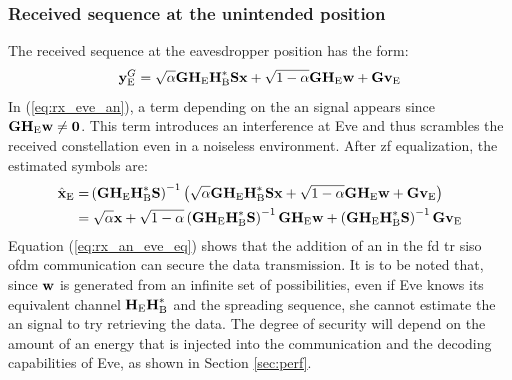 \subsubsection{Received sequence at the unintended position}
The received sequence at the eavesdropper position has the form:
\begin{equation}
    \textbf{y}_{\text{E}}^G = \sqrt{\alpha}  \textbf{G} \textbf{H}_{\text{E}} \textbf{H}_{\text{B}}^* \textbf{S}\textbf{x} + \sqrt{1-\alpha} \textbf{G} \textbf{H}_{\text{E}} \textbf{w} + \textbf{G}  \textbf{v}_\text{E}
    \label{eq:rx_eve_an}
\end{equation}
In (\ref{eq:rx_eve_an}), a term depending on the \gls{an} signal appears since $\textbf{G}\textbf{H}_{\text{E}} \textbf{w} \neq \textbf{0}$. This term introduces an interference at Eve and thus scrambles the received constellation even in a noiseless environment. After \gls{zf} equalization, the estimated symbols are:
\begin{equation}
    \begin{split}
         \hat{\textbf{x}}_{\text{E}} =& \left(\textbf{G} \textbf{H}_{\text{E}} \textbf{H}_{\text{B}}^* \textbf{S} \right)^{-1}
         \left( \sqrt{\alpha} \textbf{G} \textbf{H}_{\text{E}} \textbf{H}_{\text{B}}^* \textbf{S} \textbf{x} +   \sqrt{1-\alpha} \textbf{G} \textbf{H}_{\text{E}} \textbf{w}  +  \textbf{G}  \textbf{v}_\text{E}  \right) \\
         =& \;\sqrt{\alpha}\textbf{x} + \sqrt{1-\alpha} \left(\textbf{G} \textbf{H}_{\text{E}} \textbf{H}_{\text{B}}^* \textbf{S} \right)^{-1}  \textbf{G} \textbf{H}_{\text{E}} \textbf{w} + \left(\textbf{G} \textbf{H}_{\text{E}} \textbf{H}_{\text{B}}^* \textbf{S} \right)^{-1}  \textbf{G} \textbf{v}_\text{E}
    \end{split}
    \label{eq:rx_an_eve_eq}
\end{equation}
Equation (\ref{eq:rx_an_eve_eq}) shows that the addition of \gls{an} in the \gls{fd} \gls{tr} \gls{siso} \gls{ofdm} communication can secure the data transmission. It is to be noted that, since $\textbf{w}$ is generated from an infinite set of possibilities, even if Eve knows its equivalent channel $\textbf{H}_{\text{E}}\textbf{H}_{\text{B}}^*$ and the spreading sequence, she cannot estimate the \gls{an} signal  to try retrieving the data.  The degree of security will depend on the amount of \gls{an} energy that is injected into the communication and the decoding capabilities of Eve, as shown in Section \ref{sec:perf}.


